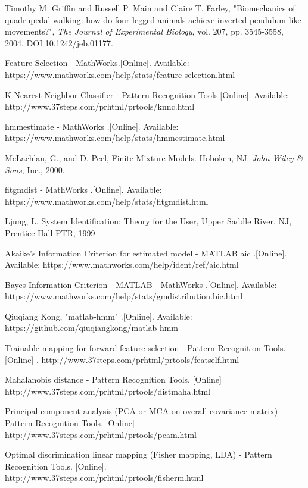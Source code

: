 \begin{thebibliography}{5}
 Timothy M. Griffin and Russell P. Main and Claire T. Farley, "Biomechanics of quadrupedal walking: how do four-legged animals achieve
inverted pendulum-like movements?", \emph{The Journal of Experimental Biology}, vol. 207, pp. 3545-3558, 2004, DOI 10.1242/jeb.01177.

 Feature Selection - MathWorks.[Online]. Available: https://www.mathworks.com/help/stats/feature-selection.html

 K-Nearest Neighbor Classifier - Pattern Recognition Tools.[Online]. Available: http://www.37steps.com/prhtml/prtools/knnc.html

 hmmestimate - MathWorks .[Online]. Available: https://www.mathworks.com/help/stats/hmmestimate.html

 McLachlan, G., and D. Peel, Finite Mixture Models. Hoboken, NJ: \emph{John Wiley \& Sons}, Inc., 2000.

 fitgmdist - MathWorks .[Online]. Available:  https://www.mathworks.com/help/stats/fitgmdist.html

 Ljung, L. System Identification: Theory for the User, Upper Saddle River, NJ, Prentice-Hall PTR, 1999

 Akaike's Information Criterion for estimated model - MATLAB aic .[Online]. Available:  https://www.mathworks.com/help/ident/ref/aic.html

 Bayes Information Criterion - MATLAB - MathWorks .[Online]. Available: https://www.mathworks.com/help/stats/gmdistribution.bic.html

 Qiuqiang Kong, "matlab-hmm" .[Online]. Available: https://github.com/qiuqiangkong/matlab-hmm

 Trainable mapping for forward feature selection - Pattern Recognition Tools. [Online] . http://www.37steps.com/prhtml/prtools/featself.html

 Mahalanobis distance - Pattern Recognition Tools. [Online] http://www.37steps.com/prhtml/prtools/distmaha.html

 Principal component analysis (PCA or MCA on overall covariance matrix) - Pattern Recognition Tools. [Online] http://www.37steps.com/prhtml/prtools/pcam.html

 Optimal discrimination linear mapping (Fisher mapping, LDA) - Pattern Recognition Tools. [Online]. http://www.37steps.com/prhtml/prtools/fisherm.html


\end{thebibliography}
